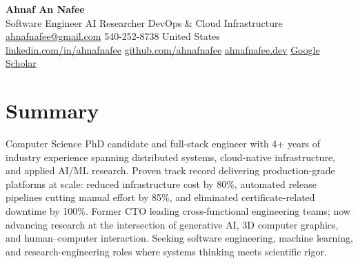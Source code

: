 \documentclass[letterpaper,10pt]{article}
\begin{document}
\begin{center}
  {\LARGE\bfseries\color{accent} Ahnaf An Nafee}\\[3pt]
  {\normalsize Software Engineer \textbar{} AI Researcher \textbar{} DevOps \& Cloud Infrastructure}\\[4pt]
  \small
  \href{mailto:ahnafnafee@gmail.com}{ahnafnafee@gmail.com} \textbar{}
  540-252-8738 \textbar{}
  United States\\
  \href{https://linkedin.com/in/ahnafnafee}{linkedin.com/in/ahnafnafee} \textbar{}
  \href{https://github.com/ahnafnafee}{github.com/ahnafnafee} \textbar{}
  \href{https://www.ahnafnafee.dev/}{ahnafnafee.dev} \textbar{}
  \href{https://scholar.google.com/citations?user=u15DO0cAAAAJ}{Google Scholar}
\end{center}

\section*{Summary}
Computer Science PhD candidate and full-stack engineer with 4+ years of industry experience spanning
distributed systems, cloud-native infrastructure, and applied AI/ML research. Proven track record
delivering production-grade platforms at scale: reduced infrastructure cost by 80\%, automated
release pipelines cutting manual effort by 85\%, and eliminated certificate-related downtime by 100\%.
Former CTO leading cross-functional engineering teams; now advancing research at the intersection of
generative AI, 3D computer graphics, and human--computer interaction. Seeking software engineering,
machine learning, and research-engineering roles where systems thinking meets scientific rigor.

\end{document}
